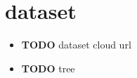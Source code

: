 \chapter{dataset}

\begin{itemize}

\item \textbf{TODO} dataset cloud url
\item \textbf{TODO} tree

\end{itemize}

